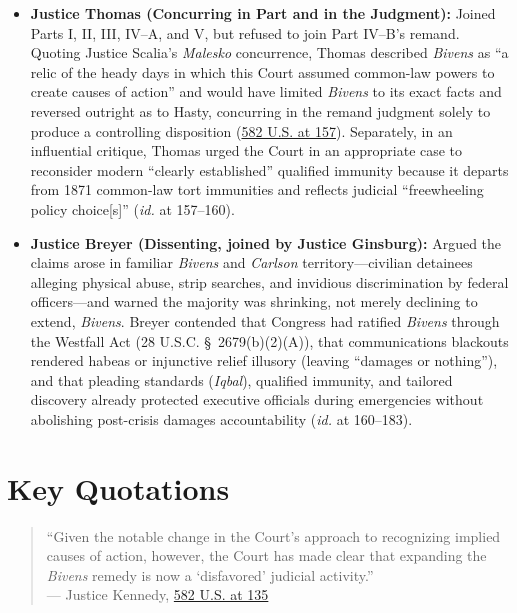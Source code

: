 \documentclass[12pt]{article}
\begin{document}
\begin{itemize}
  \item \textbf{Justice Thomas (Concurring in Part and in the Judgment):} Joined Parts I, II, III, IV--A, and V, but refused to join Part IV--B's remand. Quoting Justice Scalia's \textit{Malesko} concurrence, Thomas described \textit{Bivens} as ``a relic of the heady days in which this Court assumed common-law powers to create causes of action'' and would have limited \textit{Bivens} to its exact facts and reversed outright as to Hasty, concurring in the remand judgment solely to produce a controlling disposition (\href{https://www.law.cornell.edu/supremecourt/text/15-1358}{582 U.S. at 157}). Separately, in an influential critique, Thomas urged the Court in an appropriate case to reconsider modern ``clearly established'' qualified immunity because it departs from 1871 common-law tort immunities and reflects judicial ``freewheeling policy choice[s]'' (\textit{id.} at 157--160).
  \item \textbf{Justice Breyer (Dissenting, joined by Justice Ginsburg):} Argued the claims arose in familiar \textit{Bivens} and \textit{Carlson} territory---civilian detainees alleging physical abuse, strip searches, and invidious discrimination by federal officers---and warned the majority was shrinking, not merely declining to extend, \textit{Bivens}. Breyer contended that Congress had ratified \textit{Bivens} through the Westfall Act (28 U.S.C. \S~2679(b)(2)(A)), that communications blackouts rendered habeas or injunctive relief illusory (leaving ``damages or nothing''), and that pleading standards (\textit{Iqbal}), qualified immunity, and tailored discovery already protected executive officials during emergencies without abolishing post-crisis damages accountability (\textit{id.} at 160--183).
\end{itemize}

\section{Key Quotations}

\begin{quote}
``Given the notable change in the Court's approach to recognizing implied causes of action, however, the Court has made clear that expanding the \textit{Bivens} remedy is now a `disfavored' judicial activity.''\\
--- Justice Kennedy, \href{https://www.law.cornell.edu/supremecourt/text/15-1358}{582 U.S. at 135}
\end{quote}
\end{document}
